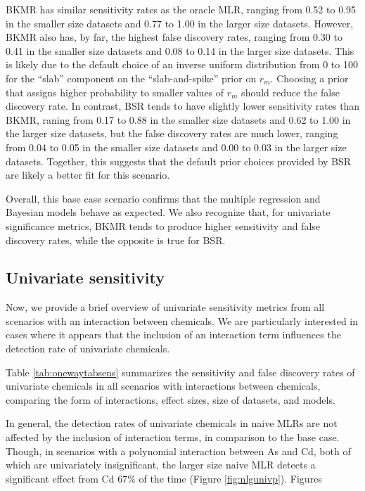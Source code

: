 \documentclass[12pt, twoside]{amherstthesis}
\begin{document}
BKMR has similar sensitivity rates as the oracle MLR, ranging from 0.52 to 0.95 in the smaller size datasets and 0.77 to 1.00 in the larger size datasets. However, BKMR also has, by far, the highest false discovery rates, ranging from 0.30 to 0.41 in the smaller size datasets and 0.08 to 0.14 in the larger size datasets. This is likely due to the default choice of an inverse uniform distribution from 0 to 100 for the ``slab'' component on the ``slab-and-spike'' prior on \(r_m\). Choosing a prior that assigns higher probability to smaller values of \(r_m\) should reduce the false discovery rate. In contrast, BSR tends to have slightly lower sensitivity rates than BKMR, raning from 0.17 to 0.88 in the smaller size datasets and 0.62 to 1.00 in the larger size datasets, but the false discovery rates are much lower, ranging from 0.04 to 0.05 in the smaller size datasets and 0.00 to 0.03 in the larger size datasets. Together, this suggests that the default prior choices provided by BSR are likely a better fit for this scenario.

Overall, this base case scenario confirms that the multiple regression and Bayesian models behave as expected. We also recognize that, for univariate significance metrics, BKMR tends to produce higher sensitivity and false discovery rates, while the opposite is true for BSR.

\hypertarget{univsenschap}{%
\subsection{Univariate sensitivity}\label{univsenschap}}

Now, we provide a brief overview of univariate sensitivity metrics from all scenarios with an interaction between chemicals. We are particularly interested in cases where it appears that the inclusion of an interaction term influences the detection rate of univariate chemicals.

Table \ref{tab:onewaytabsens} summarizes the sensitivity and false discovery rates of univariate chemicals in all scenarios with interactions between chemicals, comparing the form of interactions, effect sizes, size of datasets, and models.

In general, the detection rates of univariate chemicals in naive MLRs are not affected by the inclusion of interaction terms, in comparison to the base case. Though, in scenarios with a polynomial interaction between As and Cd, both of which are univariately insignificant, the larger size naive MLR detects a significant effect from Cd 67\% of the time (Figure \ref{fig:nlgunivp}). Figures
\end{document}
